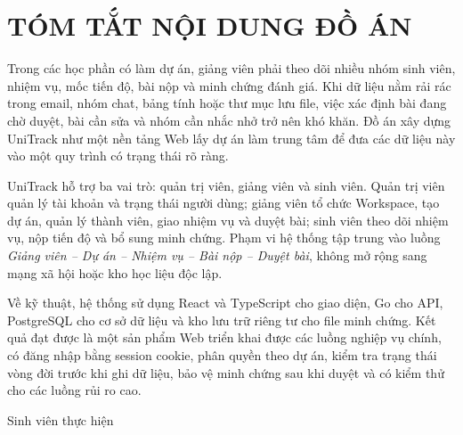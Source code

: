 \chapter*{TÓM TẮT NỘI DUNG ĐỒ ÁN}

Trong các học phần có làm dự án, giảng viên phải theo dõi nhiều nhóm sinh viên, nhiệm vụ, mốc tiến độ, bài nộp và minh chứng đánh giá. Khi dữ liệu nằm rải rác trong email, nhóm chat, bảng tính hoặc thư mục lưu file, việc xác định bài đang chờ duyệt, bài cần sửa và nhóm cần nhắc nhở trở nên khó khăn. Đồ án xây dựng UniTrack như một nền tảng Web lấy dự án làm trung tâm để đưa các dữ liệu này vào một quy trình có trạng thái rõ ràng.

UniTrack hỗ trợ ba vai trò: quản trị viên, giảng viên và sinh viên. Quản trị viên quản lý tài khoản và trạng thái người dùng; giảng viên tổ chức Workspace, tạo dự án, quản lý thành viên, giao nhiệm vụ và duyệt bài; sinh viên theo dõi nhiệm vụ, nộp tiến độ và bổ sung minh chứng. Phạm vi hệ thống tập trung vào luồng \textit{Giảng viên -- Dự án -- Nhiệm vụ -- Bài nộp -- Duyệt bài}, không mở rộng sang mạng xã hội hoặc kho học liệu độc lập.

Về kỹ thuật, hệ thống sử dụng React và TypeScript cho giao diện, Go cho API, PostgreSQL cho cơ sở dữ liệu và kho lưu trữ riêng tư cho file minh chứng. Kết quả đạt được là một sản phẩm Web triển khai được các luồng nghiệp vụ chính, có đăng nhập bằng session cookie, phân quyền theo dự án, kiểm tra trạng thái vòng đời trước khi ghi dữ liệu, bảo vệ minh chứng sau khi duyệt và có kiểm thử cho các luồng rủi ro cao.

\vspace{1cm}
\begin{flushright}
Sinh viên thực hiện

\vspace{1.6cm}

\textit{\StudentName}
\end{flushright}
